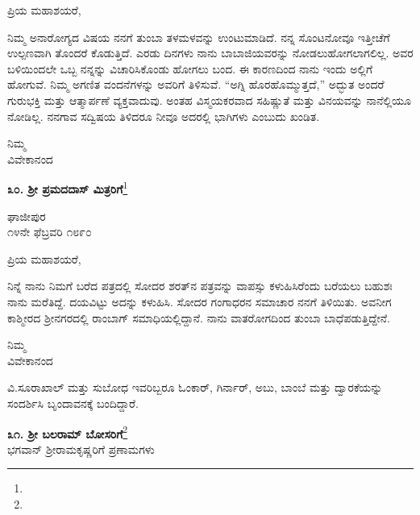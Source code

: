 \noindent
ಪ್ರಿಯ ಮಹಾಶಯರೆ,

ನಿಮ್ಮ ಅನಾರೋಗ್ಯದ ವಿಷಯ ನನಗೆ ತುಂಬಾ ತಳಮಳವನ್ನು ಉಂಟುಮಾಡಿದೆ. ನನ್ನ ಸೊಂಟನೋವೂ ಇತ್ತೀಚೆಗೆ ಉಲ್ಪಣವಾಗಿ ತೊಂದರೆ ಕೊಡುತ್ತಿದೆ. ಎರಡು ದಿನಗಳು ನಾನು ಬಾಬಾಜಿಯವರನ್ನು ನೋಡಲುಹೋಗಲಾಗಲಿಲ್ಲ. ಅವರ ಬಳಿಯಿಂದಲೇ ಒಬ್ಬ ನನ್ನನ್ನು ವಿಚಾರಿಸಿಕೊಂಡು ಹೋಗಲು ಬಂದ. ಈ ಕಾರಣದಿಂದ ನಾನು ಇಂದು ಅಲ್ಲಿಗೆ ಹೋಗುವೆ. ನಿಮ್ಮ ಅಗಣಿತ ವಂದನೆಗಳನ್ನು ಅವರಿಗೆ ತಿಳಿಸುವೆ. “ಅಗ್ನಿ ಹೊರಹೊಮ್ಮುತ್ತದೆ,” ಅದ್ಭುತ \enginline{-} ಅಂದರೆ ಗುರುಭಕ್ತಿ ಮತ್ತು ಆತ್ಮಾರ್ಪಣೆ ವ್ಯಕ್ತವಾದುವು. ಅಂತಹ ವಿಸ್ಮಯಕರವಾದ ಸಹಿಷ್ಣುತೆ ಮತ್ತು ವಿನಯವನ್ನು ನಾನೆಲ್ಲಿಯೂ ನೋಡಿಲ್ಲ. ನನಗಾವ ಸದ್ವಿಷಯ ತಿಳಿದರೂ ನೀವೂ ಅದರಲ್ಲಿ ಭಾಗಿಗಳು ಎಂಬುದು ಖಂಡಿತ.

\vspace{-0.5cm}

{\flushright
ನಿಮ್ಮ\\ವಿವೇಕಾನಂದ\par}

\vspace{-0.5cm}

\begin{center}
\textbf{೩೦. ಶ‍್ರೀ ಪ್ರಮದದಾಸ್ ಮಿತ್ರರಿಗೆ}\footnote{}
\end{center}

\vspace{-0.5cm}

\begin{flushright}
ಘಾಜೀಪುರ\\೧೪ನೇ ಫೆಬ್ರವರಿ ೧೮೯೦
\end{flushright}

\noindent
ಪ್ರಿಯ ಮಹಾಶಯರೆ,

ನಿನ್ನೆ ನಾನು ನಿಮಗೆ ಬರೆದ ಪತ್ರದಲ್ಲಿ ಸೋದರ ಶರತ್‌ನ ಪತ್ರವನ್ನು ವಾಪಸ್ಸು ಕಳುಹಿಸಿರೆಂದು ಬರೆಯಲು ಬಹುಶಃ ನಾನು ಮರೆತಿದ್ದೆ. ದಯವಿಟ್ಟು ಅದನ್ನು ಕಳುಹಿಸಿ. ಸೋದರ ಗಂಗಾಧರನ ಸಮಾಚಾರ ನನಗೆ ತಿಳಿಯಿತು. ಅವನೀಗ ಕಾಶ್ಮೀರದ ಶ‍್ರೀನಗರದಲ್ಲಿ ರಾಂಬಾಗ್ ಸಮಾಧಿಯಲ್ಲಿದ್ದಾನೆ. ನಾನು ವಾತರೋಗದಿಂದ ತುಂಬಾ ಬಾಧೆಪಡುತ್ತಿದ್ದೇನೆ.

{\flushright
ನಿಮ್ಮ\\ವಿವೇಕಾನಂದ\par}

ವಿ.ಸೂ\enginline{-}ರಾಖಾಲ್ ಮತ್ತು ಸುಬೋಧ ಇವರಿಬ್ಬರೂ ಓಂಕಾರ್, ಗಿರ್ನಾರ್‌, ಅಬು, ಬಾಂಬೆ ಮತ್ತು ದ್ವಾರಕೆಯನ್ನು ಸಂದರ್ಶಿಸಿ ಬೃಂದಾವನಕ್ಕೆ ಬಂದಿದ್ದಾರೆ.

\begin{center}
\textbf{೩೧. ಶ‍್ರೀ ಬಲರಾಮ್ ಬೋಸರಿಗೆ}\footnote{}\\ ಭಗವಾನ್ ಶ‍್ರೀರಾಮಕೃಷ್ಣರಿಗೆ ಪ್ರಣಾಮಗಳು
\end{center}

\vspace{-0.5cm}

